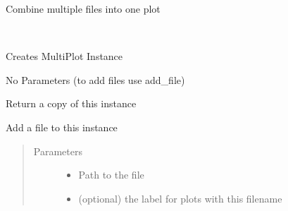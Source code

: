\documentclass[letterpaper,10pt,openany,oneside,english]{sphinxmanual}
\begin{document}
\begin{fulllineitems}
\label{\detokenize{plots:plots.MultiPlot}}
Combine multiple files into one plot

\begin{fulllineitems}
\label{\detokenize{plots:plots.MultiPlot.__init__}}~
\begin{DUlineblock}{0em}
\item[] Creates MultiPlot Instance  
\item[] No Parameters (to add files use add\_file)  
\end{DUlineblock}

\end{fulllineitems}


\begin{fulllineitems}
\label{\detokenize{plots:plots.MultiPlot.clone}}
Return a copy of this instance

\end{fulllineitems}


\begin{fulllineitems}
\label{\detokenize{plots:plots.MultiPlot.add_file}}
Add a file to this instance
\begin{quote}\begin{description}
\item[{Parameters}] \leavevmode\begin{itemize}
\item {} 
 \textendash{} Path to the file

\item {} 
 \textendash{} (optional) the label for plots with this filename

\end{itemize}

\end{description}\end{quote}

\end{fulllineitems}


\end{fulllineitems}
\end{document}

